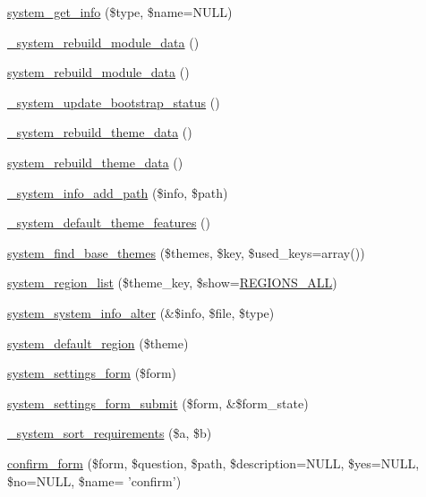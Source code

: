 \begin{DoxyCompactItemize}
\item 
\hyperlink{system_8module_af54208dab08c482b465a7f10225ebbb7}{system\_\-get\_\-info} (\$type, \$name=NULL)
\item 
\hyperlink{system_8module_aec98f44cde3933b35e0cb066d387c54c}{\_\-system\_\-rebuild\_\-module\_\-data} ()
\item 
\hyperlink{system_8module_a2c3c848bc7c14d6f770a2f8df8f35332}{system\_\-rebuild\_\-module\_\-data} ()
\item 
\hyperlink{system_8module_aef42ac3dd9a7dc00aa996206423a1837}{\_\-system\_\-update\_\-bootstrap\_\-status} ()
\item 
\hyperlink{system_8module_ac3eaa9c509c1446605136070ddbf5016}{\_\-system\_\-rebuild\_\-theme\_\-data} ()
\item 
\hyperlink{system_8module_a702e05f2ab6d4ac7e8be5b0e07afa701}{system\_\-rebuild\_\-theme\_\-data} ()
\item 
\hyperlink{system_8module_af55f5f5ba28e42c6fb21471e13f68017}{\_\-system\_\-info\_\-add\_\-path} (\$info, \$path)
\item 
\hyperlink{system_8module_a60145d0b4f9bc1069e6349aae007a1b6}{\_\-system\_\-default\_\-theme\_\-features} ()
\item 
\hyperlink{system_8module_a0cd2b51f55ab9299f139f9916bf7a7c0}{system\_\-find\_\-base\_\-themes} (\$themes, \$key, \$used\_\-keys=array())
\item 
\hyperlink{system_8module_a83141ec3e67f121c72317be0c674dfe6}{system\_\-region\_\-list} (\$theme\_\-key, \$show=\hyperlink{system_8module_a39507d6bcc536ccdb523d962a7b8a5db}{REGIONS\_\-ALL})
\item 
\hyperlink{system_8module_afbaff10d8aad0b8916039e458292218c}{system\_\-system\_\-info\_\-alter} (\&\$info, \$file, \$type)
\item 
\hyperlink{system_8module_a8d1d2449c553874ab0ba1d2a4b132fd3}{system\_\-default\_\-region} (\$theme)
\item 
\hyperlink{group__forms_ga6fb270d34465d846cd4659a85d3e40c8}{system\_\-settings\_\-form} (\$form)
\item 
\hyperlink{system_8module_a1ac9556d37dcf1ec5836b0171757c610}{system\_\-settings\_\-form\_\-submit} (\$form, \&\$form\_\-state)
\item 
\hyperlink{system_8module_a7f01a6fc963253dd29b712a0b94d298c}{\_\-system\_\-sort\_\-requirements} (\$a, \$b)
\item 
\hyperlink{system_8module_a5457fea1ad5cf2e3767f3fc6e36b768b}{confirm\_\-form} (\$form, \$question, \$path, \$description=NULL, \$yes=NULL, \$no=NULL, \$name= 'confirm')

\end{DoxyCompactItemize}
